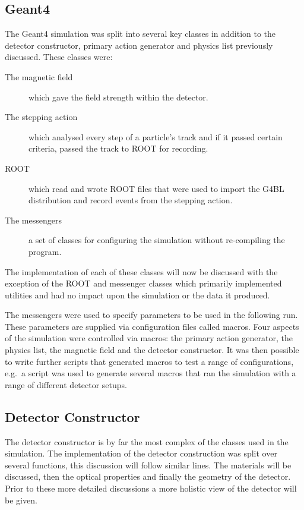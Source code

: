\subsection{Geant4} %
\label{sub:geant4}
The Geant4 simulation was split into several key classes in addition to the detector constructor, primary action generator and physics list previously discussed. These classes were:
\begin{description}
  \item[The magnetic field] which gave the field strength within the detector.
  \item[The stepping action] which analysed every step of a particle's track and if it passed certain criteria, passed the track to ROOT for recording.
  \item[ROOT] which read and wrote ROOT files that were used to import the G4BL distribution and record events from the stepping action.
  \item[The messengers] a set of classes for configuring the simulation without re-compiling the program.
\end{description}
The implementation of each of these classes will now be discussed with the exception of the ROOT and messenger classes which primarily implemented utilities and had no impact upon the simulation or the data it produced.

The messengers were used to specify parameters to be used in the following run. These parameters are supplied via configuration files called macros. Four aspects of the simulation were controlled via macros: the primary action generator, the physics list, the magnetic field and the detector constructor. It was then possible to write further scripts that generated macros to test a range of configurations, e.g.\ a script was used to generate several macros that ran the simulation with a range of different detector setups.

\subsection{Detector Constructor} %
\label{sec:detector_constructor}
The detector constructor is by far the most complex of the classes used in the simulation. The implementation of the detector construction was split over several functions, this discussion will follow similar lines. The materials will be discussed, then the optical properties and finally the geometry of the detector. Prior to these more detailed discussions a more holistic view of the detector will be given.

